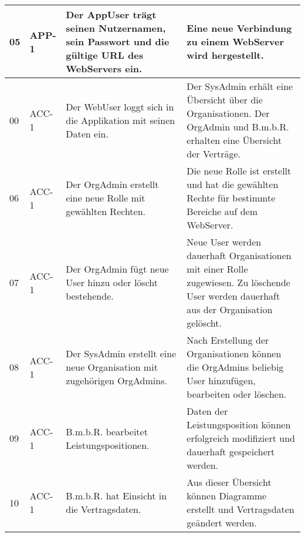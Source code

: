 \begin{longtable}[c]{|p{1cm}|p{3cm}|p{4cm}|p{6cm}|}
    05           & APP-1                      & Der AppUser trägt seinen Nutzernamen, sein Passwort und die gültige URL des WebServers ein.                        & Eine neue Verbindung zu einem WebServer wird hergestellt.                                                                                                                  \\ \hline
    00           & ACC-1                      & Der WebUser loggt sich in die Applikation mit seinen Daten ein.                                                    & Der SysAdmin erhält eine Übersicht über die Organisationen. Der OrgAdmin und B.m.b.R. erhalten eine Übersicht der Verträge. \\ \hline
    06           & ACC-1                      & Der OrgAdmin erstellt eine neue Rolle mit gewählten Rechten.                                                       & Die neue Rolle ist erstellt und hat die gewählten Rechte für bestimmte Bereiche auf dem WebServer.                                                                         \\ \hline
    07           & ACC-1                      & Der OrgAdmin fügt neue User hinzu oder löscht bestehende.                                                        & Neue User werden dauerhaft Organisationen mit einer Rolle zugewiesen. Zu löschende User werden dauerhaft aus der Organisation gelöscht.                                \\ \hline
    08           & ACC-1                      & Der SysAdmin erstellt eine neue Organisation mit zugehörigen OrgAdmins.                                            & Nach Erstellung der Organisationen können die OrgAdmins beliebig User hinzufügen, bearbeiten oder löschen.                                                               \\ \hline
    09           & ACC-1                      & B.m.b.R. bearbeitet Leistungspositionen.                                                                           & Daten der Leistungsposition können erfolgreich modifiziert und dauerhaft gespeichert werden.                                                                               \\ \hline
    10           & ACC-1                      & B.m.b.R. hat Einsicht in die Vertragsdaten.                                                                        & Aus dieser Übersicht können Diagramme erstellt und Vertragsdaten geändert werden.                                                                                          \\ \hline

\end{longtable}
